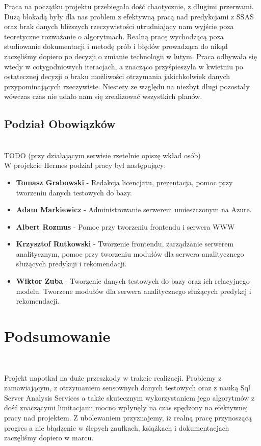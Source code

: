 \documentclass[licencjacka]{pracamgr}
\begin{document}
Praca na początku projektu przebiegała dość chaotycznie, z długimi przerwami. Dużą blokadą były dla nas problem z efektywną pracą nad predykcjami z SSAS oraz brak danych bliższych rzeczywistości utrudniający nam wyjście poza teoretyczne rozważanie o algorytmach. Realną pracę wychodzącą poza studiowanie dokumentacji i metodę prób i błędów prowadząca do nikąd zaczęliśmy dopiero po decyzji o zmianie technologii w lutym. Praca odbywała się wtedy w cotygodniowych iteracjach, a znacząco przyśpieszyła w kwietniu po ostatecznej decyzji o braku możliwości otrzymania jakichkolwiek danych przypominających rzeczywiste. Niestety ze względu na niezbyt długi pozostały wówczas czas nie udało nam się zrealizować wszystkich planów.

\section{Podział Obowiązków} ~\\

TODO (przy działającym serwisie rzetelnie opiszę wkład osób)
~\\ \indent W projekcie Hermes podział pracy był następujący:

\begin{itemize}
\item \textbf{Tomasz Grabowski} - Redakcja licencjatu, prezentacja, pomoc przy tworzeniu danych testowych do bazy.
\item \textbf{Adam Markiewicz} - Administrowanie serwerem umieszczonym na Azure.
\item \textbf{Albert Rozmus} - Pomoc przy tworzeniu frontendu i serwera WWW
\item \textbf{Krzysztof Rutkowski} - Tworzenie frontendu, zarządzanie serwerem analitycznym, pomoc przy tworzeniu modułów dla serwera analitycznego służących predykcji i rekomendacji.
\item \textbf{Wiktor Zuba} - Tworzenie danych testowych do bazy oraz ich relacyjnego modelu. Tworzene modułów dla serwera analitycznego służących predykcj i rekomendacji.
\end{itemize}

\chapter{Podsumowanie} ~\\ \indent


Projekt napotkał na duże przeszkody w trakcie realizacji. Problemy z zamawiającym, z otrzymaniem sensownych danych testowych oraz z nauką Sql Server Analysis Services a także skutecznym wykorzystaniem jego algorytmów z dość znaczącymi limitacjami mocno wpłynęły na czas spędzony na efektywnej pracy nad projektem. Z ubolewaniem przyznajemy, iż realną pracę przynoszącą progres a nie błądzenie w ślepych zaułkach, książkach i dokumentacjach zaczęliśmy dopiero w marcu.
\end{document}
